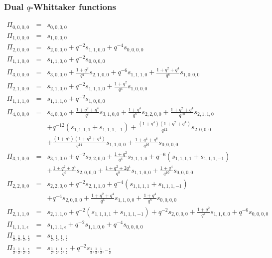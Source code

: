\documentclass[12pt]{amsart}
\numberwithin{equation}{section}
\numberwithin{table}{section}
\begin{document}
\begin{appendix}
\subsubsection{Dual $q$-Whittaker functions}


\begin{eqnarray*}
\Pi_{0,0,0,0}&=&s_{0,0,0,0}\\
\Pi_{1,0,0,0}&=&s_{1,0,0,0}\\
\Pi_{2,0,0,0}&=&s_{2,0,0,0}+q^{-2}s_{1,1,0,0}+q^{-4}s_{0,0,0,0}\\
\Pi_{1,1,0,0}&=&s_{1,1,0,0}+q^{-2}s_{0,0,0,0}\\
\Pi_{3,0,0,0}&=&s_{3,0,0,0}+\frac{1+q^2}{q^4}s_{2,1,0,0}+q^{-6}s_{1,1,1,0}+
\frac{1+q^2+q^4}{q^8}s_{1,0,0,0}\\
\Pi_{2,1,0,0}&=&s_{2,1,0,0}+q^{-2}s_{1,1,1,0}+
\frac{1+q^2}{q^4}s_{1,0,0,0}\\
\Pi_{1,1,1,0}&=&s_{1,1,1,0}+
q^{-2}s_{1,0,0,0}\\
\Pi_{4,0,0,0}&=&s_{4,0,0,0}+\frac{1+q^2+q^4}{q^6}s_{3,1,0,0}+\frac{1+q^4}{q^8}s_{2,2,0,0}+
\frac{1+q^2+q^4}{q^{10}}s_{2,1,1,0}\\
&&+q^{-12}(s_{1,1,1,1}+s_{1,1,1,-1})+\frac{(1+q^4)(1+q^2+q^4)}{q^{12}}s_{2,0,0,0}\\
&&+\frac{(1+q^4)(1+q^2+q^4)}{q^{14}}s_{1,1,0,0}+\frac{1+q^4+q^8}{q^{16}}s_{0,0,0,0}\\
\Pi_{3,1,0,0}&=&s_{3,1,0,0}+q^{-2}s_{2,2,0,0}+
\frac{1+q^2}{q^{4}}s_{2,1,1,0}+q^{-6}(s_{1,1,1,1}+s_{1,1,1,-1})\\
&&+
\frac{1+q^2+q^4}{q^6}s_{2,0,0,0}+\frac{1+q^2+2q^4}{q^8}s_{1,1,0,0}+\frac{1+q^4}{q^{10}}s_{0,0,0,0}\\
\Pi_{2,2,0,0}&=&s_{2,2,0,0}+
q^{-2}s_{2,1,1,0}+q^{-4}(s_{1,1,1,1}+s_{1,1,1,-1})\\
&&+
q^{-4}s_{2,0,0,0}+\frac{1+q^2+q^4}{q^6}s_{1,1,0,0}+\frac{1+q^4}{q^{8}}s_{0,0,0,0}\\
\Pi_{2,1,1,0}&=&s_{2,1,1,0}+q^{-2}(s_{1,1,1,1}+s_{1,1,1,-1})+
q^{-2}s_{2,0,0,0}+\frac{1+q^2}{q^4}s_{1,1,0,0}+q^{-6}s_{0,0,0,0}\\
\Pi_{1,1,1,\epsilon}&=&s_{1,1,1,\epsilon}+q^{-2}s_{1,1,0,0}+q^{-4}s_{0,0,0,0}\\
\Pi_{\frac{1}{2},\frac{1}{2},\frac{1}{2},\frac{\epsilon}{2}}&=&
s_{\frac{1}{2},\frac{1}{2},\frac{1}{2},\frac{\epsilon}{2}}\\
\Pi_{\frac{3}{2},\frac{1}{2},\frac{1}{2},\frac{\epsilon}{2}}&=&s_{\frac{3}{2},\frac{1}{2},\frac{1}{2},\frac{\epsilon}{2}}
+q^{-2}s_{\frac{1}{2},\frac{1}{2},\frac{1}{2},-\frac{\epsilon}{2}}\\

\end{eqnarray*}
\end{appendix}
\end{document}
